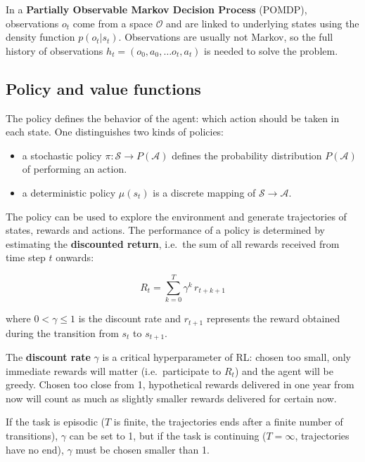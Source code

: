 \documentclass[
  letterpaper,
  DIV=11,
  numbers=noendperiod]{scrreprt}
\providecommand{\tightlist}{%
  \setlength{\itemsep}{0pt}\setlength{\parskip}{0pt}}\usepackage{longtable,booktabs,array}
\begin{document}
In a \textbf{Partially Observable Markov Decision Process} (POMDP),
observations \(o_t\) come from a space \(\mathcal{O}\) and are linked to
underlying states using the density function \(p(o_t| s_t)\).
Observations are usually not Markov, so the full history of observations
\(h_t = (o_0, a_0, \dots o_t, a_t)\) is needed to solve the problem.

\hypertarget{policy-and-value-functions}{%
\subsection{Policy and value
functions}\label{policy-and-value-functions}}

The policy defines the behavior of the agent: which action should be
taken in each state. One distinguishes two kinds of policies:

\begin{itemize}
\tightlist
\item
  a stochastic policy \(\pi : \mathcal{S} \rightarrow P(\mathcal{A})\)
  defines the probability distribution \(P(\mathcal{A})\) of performing
  an action.
\item
  a deterministic policy \(\mu(s_t)\) is a discrete mapping of
  \(\mathcal{S} \rightarrow \mathcal{A}\).
\end{itemize}

The policy can be used to explore the environment and generate
trajectories of states, rewards and actions. The performance of a policy
is determined by estimating the \textbf{discounted return}, i.e.~the sum
of all rewards received from time step \(t\) onwards:

\[
    R_t = \sum_{k=0}^{T} \gamma^k \, r_{t+k+1}
\]

where \(0 < \gamma \leq 1\) is the discount rate and \(r_{t+1}\)
represents the reward obtained during the transition from \(s_t\) to
\(s_{t+1}\).

The \textbf{discount rate} \(\gamma\) is a critical hyperparameter of
RL: chosen too small, only immediate rewards will matter
(i.e.~participate to \(R_t\)) and the agent will be greedy. Chosen too
close from 1, hypothetical rewards delivered in one year from now will
count as much as slightly smaller rewards delivered for certain now.

If the task is episodic (\(T\) is finite, the trajectories ends after a
finite number of transitions), \(\gamma\) can be set to 1, but if the
task is continuing (\(T=\infty\), trajectories have no end), \(\gamma\)
must be chosen smaller than 1.
\end{document}
